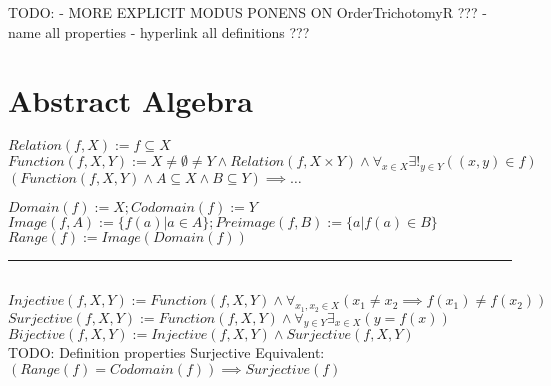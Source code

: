\documentclass{book}
\newcommand{\abr}{:=}
\begin{document}
TODO:
- MORE EXPLICIT MODUS PONENS ON OrderTrichotomyR ???
- name all properties
- hyperlink all definitions ???

\chapter{Abstract Algebra}
$Relation(f, X) \abr f \subseteq X$ \\
$Function(f, X, Y) \abr X \neq \emptyset \neq Y \land Relation(f, X \times Y) \land \forall_{x \in X} \exists!_{y \in Y}((x, y) \in f)$ \\

$(Function(f, X, Y) \land A \subseteq X \land B \subseteq Y) \implies \ldots$
\begin{enumerate}
  \lit $Domain(f) \abr X; Codomain(f) \abr Y$ %
  \lit $Image(f, A) \abr \{f(a) | a \in A\}; Preimage(f, B) \abr \{a | f(a) \in B\}$
  \lit $Range(f) \abr Image(Domain(f))$
\end{enumerate} \vspace{.75mm} \hrule \vspace{.75mm} \ \\ 

$Injective(f, X, Y) \abr Function(f, X, Y) \land \forall_{x_1, x_2 \in X}(x_1 \neq x_2 \implies f(x_1) \neq f(x_2))$ \\ %
$Surjective(f, X, Y) \abr Function(f, X, Y) \land \forall_{y \in Y} \exists_{x \in X}(y = f(x))$ \\ %
$Bijective(f, X, Y) \abr Injective(f, X, Y) \land Surjective(f, X, Y)$ \\ %

TODO: Definition properties
Surjective Equivalent: $(Range(f) = Codomain(f)) \implies Surjective(f)$ \\



 
\end{document}
